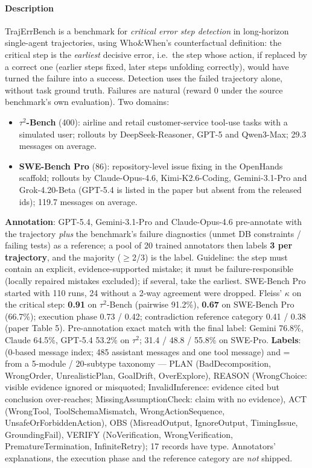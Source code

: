 \paragraph{Description} TrajErrBench is a benchmark for \emph{critical error step detection} in long-horizon single-agent trajectories, using Who\&When's counterfactual definition: the critical step is the \emph{earliest} decisive error, i.e.\ the step whose action, if replaced by a correct one (earlier steps fixed, later steps unfolding correctly), would have turned the failure into a success. Detection uses the failed trajectory alone, without task ground truth. Failures are natural (reward 0 under the source benchmark's own evaluation). Two domains:
\begin{itemize}
\item \textbf{$\tau^2$-Bench} (400): airline and retail customer-service tool-use tasks with a simulated user; rollouts by DeepSeek-Reasoner, GPT-5 and Qwen3-Max; 29.3 messages on average.
\item \textbf{SWE-Bench Pro} (86): repository-level issue fixing in the OpenHands scaffold; rollouts by Claude-Opus-4.6, Kimi-K2.6-Coding, Gemini-3.1-Pro and Grok-4.20-Beta (GPT-5.4 is listed in the paper but absent from the released ids); 119.7 messages on average.
\end{itemize}
\textbf{Annotation}: GPT-5.4, Gemini-3.1-Pro and Claude-Opus-4.6 pre-annotate with the trajectory \emph{plus} the benchmark's failure diagnostics (unmet DB constraints / failing tests) as a reference; a pool of 20 trained annotators then labels \textbf{3 per trajectory}, and the majority ($\ge$2/3) is the label. Guideline: the step must contain an explicit, evidence-supported mistake; it must be failure-responsible (locally repaired mistakes excluded); if several, take the earliest. SWE-Bench Pro started with 110 runs, 24 without a 2-way agreement were dropped. Fleiss' $\kappa$ on the critical step: \textbf{0.91} on $\tau^2$-Bench (pairwise 91.2\%), \textbf{0.67} on SWE-Bench Pro (66.7\%); execution phase 0.73 / 0.42; contradiction reference category 0.41 / 0.38 (paper Table 5). Pre-annotation exact match with the final label: Gemini 76.8\%, Claude 64.5\%, GPT-5.4 53.2\% on $\tau^2$; 31.4 / 48.8 / 55.8\% on SWE-Pro. \textbf{Labels}:  (0-based message index; 485 assistant messages and one tool message) and  =  from a 5-module / 20-subtype taxonomy --- PLAN (BadDecomposition, WrongOrder, UnrealisticPlan, GoalDrift, OverExplore), REASON (WrongChoice: visible evidence ignored or misquoted; InvalidInference: evidence cited but conclusion over-reaches; MissingAssumptionCheck: claim with no evidence), ACT (WrongTool, ToolSchemaMismatch, WrongActionSequence, UnsafeOrForbiddenAction), OBS (MisreadOutput, IgnoreOutput, TimingIssue, GroundingFail), VERIFY (NoVerification, WrongVerification, PrematureTermination, InfiniteRetry); 17 records have  type. Annotators' explanations, the execution phase and the reference category are \emph{not} shipped.

